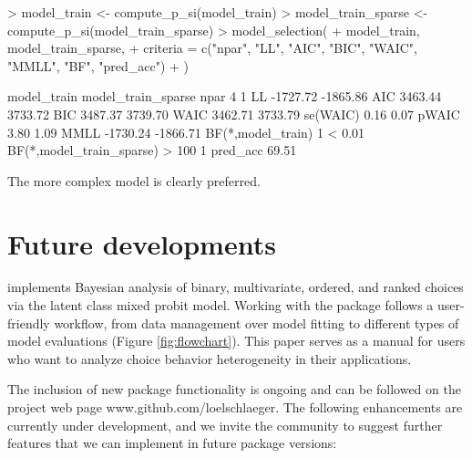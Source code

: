 \documentclass[article,shortnames]{jss}
\begin{document}
\begin{Schunk}
\begin{Sinput}
> model_train <- compute_p_si(model_train)
> model_train_sparse <- compute_p_si(model_train_sparse)
> model_selection(
+    model_train, model_train_sparse,
+    criteria = c("npar", "LL", "AIC", "BIC", "WAIC", "MMLL", "BF", "pred_acc")
+  )
\end{Sinput}
\begin{Soutput}
                         model_train model_train_sparse
npar                               4                  1
LL                          -1727.72           -1865.86
AIC                          3463.44            3733.72
BIC                          3487.37            3739.70
WAIC                         3462.71            3733.79
se(WAIC)                        0.16               0.07
pWAIC                           3.80               1.09
MMLL                        -1730.24           -1866.71
BF(*,model_train)                  1             < 0.01
BF(*,model_train_sparse)       > 100                  1
pred_acc                      69.51%
\end{Soutput}
\end{Schunk}

The more complex model is clearly preferred.

\section{Future developments} \label{sec:conclusion}

 implements Bayesian analysis of binary, multivariate, ordered, and ranked choices via the latent class mixed probit model. Working with the package follows a user-friendly workflow, from data management over model fitting to different types of model evaluations (Figure \ref{fig:flowchart}). This paper serves as a manual for  users who want to analyze choice behavior heterogeneity in their applications.

The inclusion of new package functionality is ongoing and can be followed on the project web page www.github.com/loelschlaeger. The following enhancements are currently under development, and we invite the community to suggest further features that we can implement in future package versions:
\end{document}
